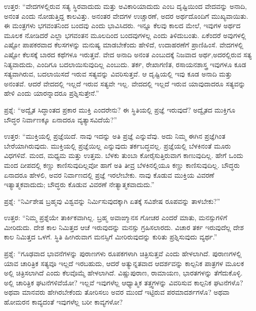\vskip 4pt

ಉತ್ತರ: “ವೇದಗಳಲ್ಲಿರುವ ಸತ್ಯ ಸ್ಥಿರವಾದುದು ಮತ್ತು ಅವಿಕಾರಿಯಾದುದು ಎಂಬ ದೃಷ್ಟಿಯಿಂದ ವೇದವನ್ನು ಅನಾದಿ, ಅನಂತ ಎಂದು ನೋಡುತ್ತಿದ್ದ ಕಾಲವಿತ್ತು. ಅನಂತರ ವೇದಗಳ ಉಚ್ಚಾರಣೆ, ಅದರ ಅರ್ಥದೊಂದಿಗೆ ಮುಖ್ಯವಾಯಿತು. ಈ ಮಂತ್ರಗಳು ಭಗವಂತನಿಂದ ಬಂದವು ಎಂದು ಭಾವಿಸಿದರು. ಇನ್ನೂ ಕೆಲವು ಕಾಲದ ಮೇಲೆ, ಇವುಗಳ ಅರ್ಥದ ಮೂಲಕ ನೋಡಿದರೆ ಎಲ್ಲಾ ಭಗವಂತನ ಮೂಲದಿಂದ ಬಂದವುಗಳಲ್ಲ ಎಂದು ತಿಳಿದುಬಂತು. ಏಕೆಂದರೆ ಅವುಗಳಲ್ಲಿ ಎಷ್ಟೋ ಪಾಪಕರವಾದ ಕೆಲಸಗಳನ್ನು ಮನುಷ್ಯ ಮಾಡಬೇಕೆಂದು ಹೇಳಿದೆ, ಉದಾಹರಣೆಗೆ ಪ್ರಾಣಿಹಿಂಸೆ. ವೇದಗಳಲ್ಲಿ ಎಷ್ಟೋ ಕೆಲಸಕ್ಕೆ ಬಾರದ ಕಥೆಗಳೂ ಇರುತ್ತವೆ. ವೇದ ಅನಾದಿ ಅನಂತ ಎಂಬುದಕ್ಕೆ ನಿಜವಾದ ಅರ್ಥ,\break ಅದರಲ್ಲಿರುವ ಸತ್ಯ ನಿತ್ಯವಾದುದು, ಎಂದಿಗೂ ಬದಲಾಯಿಸುವುದಿಲ್ಲ ಎಂಬುದು. ತರ್ಕ, ರೇಖಾಗಣಿತ, ರಸಾಯನಶಾಸ್ತ್ರ ಇವುಗಳೂ ಕೂಡ ಸತ್ಯವಾಗಿರುವ, ಬದಲಾಯಿಸದೆ ಇರುವ ಸತ್ಯವನ್ನು ವಿವರಿಸುತ್ತವೆ. ಆ ದೃಷ್ಟಿಯಲ್ಲಿ ಇವು ಕೂಡ ಅನಾದಿ ಮತ್ತು ಅನಂತವೆ. ಆದರೆ ವೇದದಲ್ಲಿ ಇಲ್ಲದೆ ಇರುವ ಸತ್ಯವೇ ಇಲ್ಲ. ವೇದದಲ್ಲಿ ಇಲ್ಲದೆ ಇರುವ ಯಾವುದಾದರೂ ಸತ್ಯವನ್ನು ಹೇಳಿ ಎಂದು ಯಾರನ್ನಾದರೂ ಪ್ರಶ್ನಿಸುತ್ತೇನೆ.”

\vskip 4pt

ಪ್ರಶ್ನೆ: “ಅದ್ವೈತ ಸಿದ್ಧಾಂತದ ಪ್ರಕಾರ ಮುಕ್ತಿ ಎಂದರೇನು? ಈ ಸ್ಥಿತಿಯಲ್ಲಿ ಪ್ರಜ್ಞೆ ಇರುವುದೆ? ಅದ್ವೈತದ ಮುಕ್ತಿಗೂ ಬೌದ್ಧರ ನಿರ್ವಾಣಕ್ಕೂ ಏನಾದರೂ ವ್ಯತ್ಯಾಸವಿದೆಯೆ?”

\vskip 4pt

ಉತ್ತರ: “ಮುಕ್ತಿಯಲ್ಲಿ ಪ್ರಜ್ಞೆಯಿದೆ. ನಾವು ಇದನ್ನು ಅತಿ ಪ್ರಜ್ಞೆ ಎನ್ನುವೆವು. ಅದು ನಿಮ್ಮ ಈಗಿನ ಪ್ರಜ್ಞೆಗಿಂತ ಬೇರೆಯಾಗಿರುವುದು. ಮುಕ್ತಿಯಲ್ಲಿ ಪ್ರಜ್ಞೆಯಿಲ್ಲ ಎನ್ನುವುದು ತರ್ಕಬದ್ಧವಲ್ಲ. ಪ್ರಜ್ಞೆಯಲ್ಲಿ ಬೆಳಕಿನಂತೆ ಮೂರು ವಿಧಗಳಿವೆ. ಮಂದ, ಮಧ್ಯಮ ಮತ್ತು ಉತ್ತಮ. ಬೆಳಕು ತುಂಬಾ ಕೋರೈಸುತ್ತಿರುವಾಗ ಕಾಣುವುದಿಲ್ಲ. ಹೇಗೆ ಒಂದು ಮಂದ ದೀಪದಲ್ಲಿ ಕಣ್ಣು ಕಾಣಿಸುವುದಿಲ್ಲವೋ ಹಾಗೆ ಅತಿ ತೀವ್ರ ಬೆಳಕಿನಲ್ಲಿಯೂ ಕಣ್ಣು ಕಾಣಿಸುವುದಿಲ್ಲ. ಬೌದ್ಧರು ಏನಾದರೂ ಹೇಳಲಿ, ಅವರ ನಿರ್ವಾಣದಲ್ಲಿ ಪ್ರಜ್ಞೆ ಇರಲೇಬೇಕು. ನಾವು ಕೊಡುವ ಮುಕ್ತಿಯ ವಿವರಣೆ ಇತ್ಯಾತ್ಮಕವಾದುದು; ಬೌದ್ಧರು ಕೊಡುವ ವಿವರಣೆ ನೇತ್ಯಾತ್ಮಕವಾದುದು.”

\vskip 4pt

ಪ್ರಶ್ನೆ: “ನಿರ್ವಿಶೇಷ ಬ್ರಹ್ಮವು ವಿಶ್ವವನ್ನು ನಿರ್ಮಿಸುವುದಕ್ಕಾಗಿ ಏತಕ್ಕೆ ಸವಿಶೇಷ ರೂಪವನ್ನು ತಾಳಬೇಕು?”

\eject

ಉತ್ತರ: “ನಿಮ್ಮ ಪ್ರಶ್ನೆಯೇ ತಾರ್ಕಿಕವಾಗಿಲ್ಲ. ಬ್ರಹ್ಮ ಅವಾಙ್ಮಾನಸ ಗೋಚರ ಎಂದರೆ ಮಾತು, ಮನಸ್ಸುಗಳಿಗೆ ಮೀರಿದುದು. ದೇಶ ಕಾಲ ನಿಮಿತ್ತದ ಆಚೆ ಇರುವುದನ್ನು ಮನಸ್ಸು ಗ್ರಹಿಸಲಾರದು. ವಿಚಾರ ತರ್ಕ ಇರುವುದೆಲ್ಲ ದೇಶ ಕಾಲ ನಿಮಿತ್ತದ ಒಳಗೆ. ಸ್ಥಿತಿ ಹೀಗಿರುವಾಗ ಮನಸ್ಸಿಗೆ ಮೀರಿರುವುದನ್ನು ಕುರಿತು ಪ್ರಶ್ನಿಸುವುದು ವ್ಯರ್ಥ.”

ಪ್ರಶ್ನೆ: “ಗೂಢವಾದ ಭಾವನೆಗಳನ್ನು ಪುರಾಣಗಳು ರೂಪಕಗಳಾಗಿ ಚಿತ್ರಿಸುತ್ತವೆ ಎಂದು ಹೇಳಲಾಗಿದೆ. ಪುರಾಣಗಳಲ್ಲಿ ಯಾವ ಚಾರಿತ್ರಿಕ ಸತ್ಯವೂ ಇಲ್ಲದೆ ಇರಬಹುದು, ಆದರೆ ಅತ್ಯುನ್ನತವಾದ ಆದರ್ಶವನ್ನು ಕಾಲ್ಪನಿಕ ಪಾತ್ರಗಳ ಮೂಲಕ ಅಲ್ಲಿ ಚಿತ್ರಿಸಲಾಗಿದೆ ಎಂದು ಕೆಲವೊಮ್ಮೆ ಹೇಳಲಾಗಿದೆ. ವಿಷ್ಣುಪುರಾಣ, ರಾಮಾಯಣ, ಭಾರತಗಳನ್ನು ತೆಗೆದುಕೊಳ್ಳಿ. ಅಲ್ಲಿ ಚಾರಿತ್ರಿಕ ಘಟನೆಗಳಿವೆಯೋ? ಇಲ್ಲವೆ ಇವುಗಳೆಲ್ಲ ಆಧ್ಯಾತ್ಮಿಕ ತತ್ತ್ವಗಳನ್ನು ವಿವರಿಸುವ ಕಾಲ್ಪನಿಕ ಘಟನೆಗಳೊ? ಅಥವಾ ಮಾನವರು ಹೇಗಿರಬೇಕೆಂದು ತೋರಿಸಲು ಅವರ ಮುಂದೆ ಇಟ್ಟಿರುವ ಪರಮಾದರ್ಶಗಳೊ? ಅಥವಾ ಹೋಮರನ ಕಾವ್ಯದಂತೆ ಇವುಗಳೆಲ್ಲ ಬರೀ ಕಾವ್ಯಗಳೋ?

